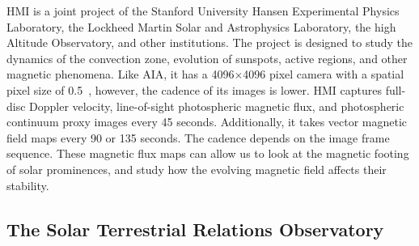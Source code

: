 HMI is a joint project of the Stanford University Hansen Experimental Physics Laboratory, the Lockheed Martin Solar and Astrophysics Laboratory, the high Altitude Observatory, and other institutions. The project is designed to study the dynamics of the convection zone, evolution of sunspots, active regions, and other magnetic phenomena. Like AIA, it has a 4096$\times$4096 pixel camera with a spatial pixel size of 0.5~\arcsec{}, however, the cadence of its images is lower. HMI captures full-disc Doppler velocity, line-of-sight photospheric magnetic flux, and photospheric continuum proxy images every 45 seconds. Additionally, it takes vector magnetic field maps every 90 or 135 seconds. The cadence depends on the image frame sequence. These magnetic flux maps can allow us to look at the magnetic footing of solar prominences, and study how the evolving magnetic field affects their stability.


\subsection{The Solar Terrestrial Relations Observatory}

